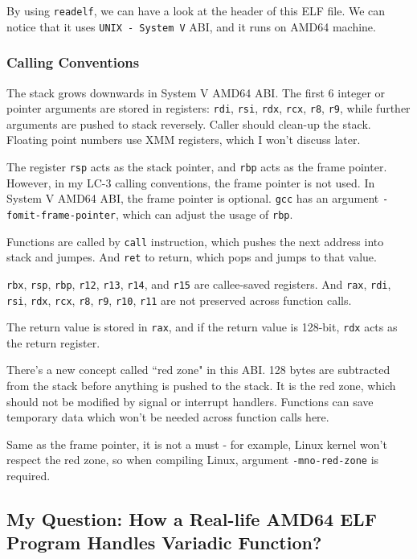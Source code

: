 \documentclass{article}
\begin{document}
	By using \texttt{readelf}, we can have a look at the header of this ELF file. We can notice that it uses \texttt{UNIX - System V} ABI, and it runs on AMD64 machine.
	
	\subsubsection{Calling Conventions}
	
	The stack grows downwards in System V AMD64 ABI. The first 6 integer or pointer arguments are stored in registers: \texttt{rdi}, \texttt{rsi}, \texttt{rdx}, \texttt{rcx}, \texttt{r8}, \texttt{r9}, while further arguments are pushed to stack reversely. Caller should clean-up the stack. Floating point numbers use XMM registers, which I won't discuss later.
	
	The register \texttt{rsp} acts as the stack pointer, and \texttt{rbp} acts as the frame pointer. However, in my LC-3 calling conventions, the frame pointer is not used. In System V AMD64 ABI, the frame pointer is optional. \texttt{gcc} has an argument \texttt{-fomit-frame-pointer}, which can adjust the usage of \texttt{rbp}.
	
	Functions are called by \texttt{call} instruction, which pushes the next address into stack and jumpes. And \texttt{ret} to return, which pops and jumps to that value.
	
	\texttt{rbx}, \texttt{rsp}, \texttt{rbp}, \texttt{r12}, \texttt{r13}, \texttt{r14}, and \texttt{r15} are callee-saved registers. And \texttt{rax}, \texttt{rdi}, \texttt{rsi}, \texttt{rdx}, \texttt{rcx}, \texttt{r8}, \texttt{r9}, \texttt{r10}, \texttt{r11} are not preserved across function calls.
	
	The return value is stored in \texttt{rax}, and if the return value is 128-bit, \texttt{rdx} acts as the  return register.
	
	There's a new concept called ``red zone" in this ABI. 128 bytes are subtracted from the stack before anything is pushed to the stack. It is the red zone, which should not be modified by signal or interrupt handlers. Functions can save temporary data which won't be needed across function calls here. 
	
	Same as the frame pointer, it is not a must - for example, Linux kernel won't respect the red zone, so when compiling Linux, argument \texttt{-mno-red-zone} is required.
	
	\subsection{My Question: How a Real-life AMD64 ELF Program Handles Variadic Function?}
	
\end{document}
